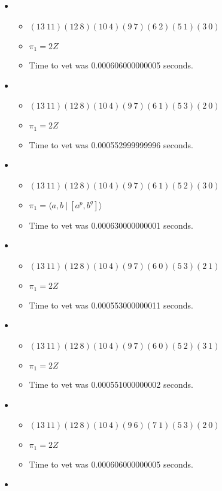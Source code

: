 \documentclass{article}
\begin{document}
\begin{itemize}
\begin{itemize}
\end{itemize}
\item \begin{itemize}
      \item $(13\ 11)(12\ 8)(10\ 4)(9\ 7)(6\ 2)(5\ 1)(3\ 0)$
      \item $\pi_1 =2 Z$
      \item Time to vet was 0.000606000000005 seconds.
\end{itemize}
\item \begin{itemize}
      \item $(13\ 11)(12\ 8)(10\ 4)(9\ 7)(6\ 1)(5\ 3)(2\ 0)$
      \item $\pi_1 =2 Z$
      \item Time to vet was 0.000552999999996 seconds.
\end{itemize}
\item \begin{itemize}
      \item $(13\ 11)(12\ 8)(10\ 4)(9\ 7)(6\ 1)(5\ 2)(3\ 0)$
      \item $\pi_1 = \langle a,b\ |\ [a^p,b^q]\rangle$
      \item Time to vet was 0.000630000000001 seconds.
\end{itemize}
\item \begin{itemize}
      \item $(13\ 11)(12\ 8)(10\ 4)(9\ 7)(6\ 0)(5\ 3)(2\ 1)$
      \item $\pi_1 =2 Z$
      \item Time to vet was 0.000553000000011 seconds.
\end{itemize}
\item \begin{itemize}
      \item $(13\ 11)(12\ 8)(10\ 4)(9\ 7)(6\ 0)(5\ 2)(3\ 1)$
      \item $\pi_1 =2 Z$
      \item Time to vet was 0.000551000000002 seconds.
\end{itemize}
\item \begin{itemize}
      \item $(13\ 11)(12\ 8)(10\ 4)(9\ 6)(7\ 1)(5\ 3)(2\ 0)$
      \item $\pi_1 =2 Z$
      \item Time to vet was 0.000606000000005 seconds.
\end{itemize}
\item \begin{itemize}

\end{itemize}
\end{itemize}
\end{document}
